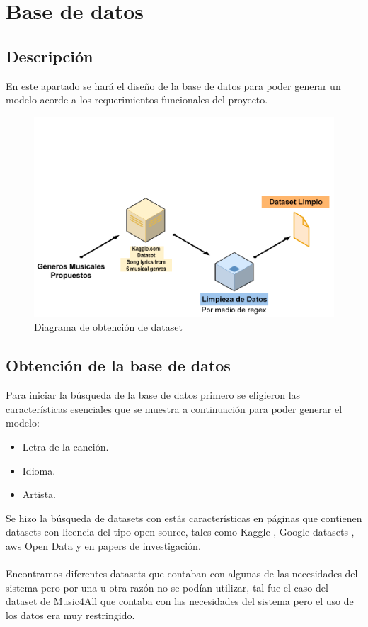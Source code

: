 \documentclass[12pt, a4paper, titlepage]{report}
\begin{document}
	\section{Base de datos} %
		\subsection{Descripción}
		En este apartado se hará el diseño de la base de datos para poder generar un modelo acorde a los requerimientos funcionales del proyecto.
		
		\begin{figure}[H] 
			\includegraphics[scale=.4]{./imagenes/Disenio/Arquitectura/Dataset_cleaned.png}
			\caption{Diagrama de obtención de dataset}
		\end{figure}
		
		\subsection{Obtención de la base de datos}
		Para iniciar la búsqueda de la base de datos primero se eligieron las características esenciales que se muestra a continuación para poder generar el modelo:
		
		\begin{itemize}
		\item Letra de la canción.
		\item Idioma.
		\item Artista.
		\end{itemize}
		
		Se hizo la búsqueda de datasets con estás características en páginas que contienen datasets con licencia del tipo open source, tales como Kaggle \cite{kaggle}, Google datasets \cite{googleDatasets}, \acrshort{aws} Open Data \cite{awsOpenData} y en papers de investigación.\\\\
		Encontramos diferentes datasets que contaban con algunas de las necesidades del sistema pero por una u otra razón no se podían utilizar, tal fue el caso del dataset de Music4All \cite{music4all} que contaba con las necesidades del sistema pero el uso de los datos era muy restringido.\\
\end{document}
